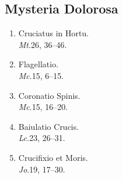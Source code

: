 \subsection*{Mysteria Dolorosa}
\vspace{-0.5em}

\begin{enumerate}[label={\roman*.}, itemsep=0pt]

\item
    Cruciatus in Hortu.
\\  {\it Mt}.\@ 26, 36--46.
\item
    Flagellatio.
\\  {\it Mc}.\@ 15, 6--15.
\item
    Coronatio Spinis.
\\  {\it Mc}.\@ 15, 16--20.
\item
    Baiulatio Crucis.
\\  {\it Lc}.\@ 23, 26--31.
\item
    Crucifixio et Moris.
\\  {\it Jo}.\@ 19, 17--30.
\end{enumerate}